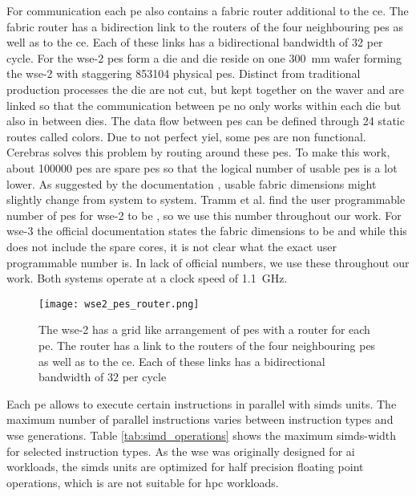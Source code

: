 For communication each \ac{pe} also contains a fabric router additional to the \ac{ce}. The fabric router has a bidirection link to the routers of the four neighbouring \acp{pe} as well as to the \ac{ce}. Each of these links has a bidirectional bandwidth of \qty{32}{\bit} per cycle. For the \ac{wse}-2  \acp{pe} form a die and  die reside on one \qty{300}{\mm} wafer forming the \ac{wse}-2 with staggering \num{853104} physical \acp{pe}. Distinct from traditional production processes the die are not cut, but kept together on the waver and are linked so that the communication between \ac{pe} no only works within each die but also in between dies.
The data flow between \acp{pe} can be defined through 24 static routes called colors.
Due to not perfect yiel, some \acp{pe} are non functional.
Cerebras solves this problem by routing around these \acp{pe}. 
To make this work, about \num{100000} \acp{pe} are spare \acp{pe} so that the logical number of usable \acp{pe} is a lot lower.
As suggested by the documentation \cite{cerebras_gemv_tutorial}, usable fabric dimensions might slightly change from system to system. Tramm et al. \cite{tramm2024efficient} find the user programmable number of \acp{pe} for \ac{wse}-2 to be , so we use this number throughout our work. For \ac{wse}-3 the official documentation states the fabric dimensions to be  and while this does not include the spare cores, it is not clear what the exact user programmable number is. In lack of official numbers, we use these throughout our work. Both systems operate at a clock speed of \qty{1.1}{\giga\hertz}.

\begin{figure}[h]
    \centering
    \texttt{[image: wse2\_pes\_router.png]}
    \caption{The \ac{wse}-2 has a grid like arrangement of \acp{pe} with a router for each \ac{pe}. The router has a link to the routers of the four neighbouring \acp{pe} as well as to the \ac{ce}. Each of these links has a bidirectional bandwidth of \qty{32}{\bit} per cycle \cite{lie2023cerebras}}
    \label{fig:wse2_pes_router}
\end{figure}

Each \ac{pe} allows to execute certain instructions in parallel with \acp{simd} units. The maximum number of parallel instructions varies between instruction types and \ac{wse} generations. Table \ref{tab:simd_operations} shows the maximum \acp{simd}-width for selected instruction types. As the \ac{wse} was originally designed for \ac{ai} workloads, the \acp{simd} units are optimized for half precision floating point operations, which is are not suitable for \ac{hpc} workloads.

